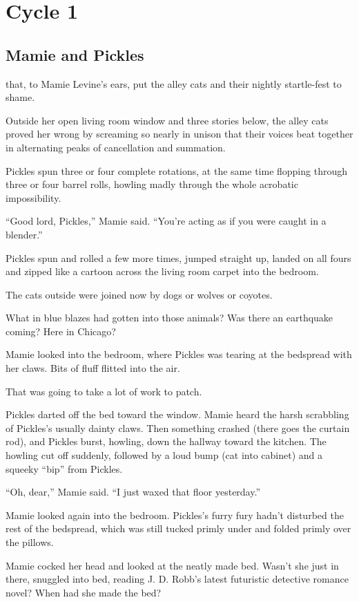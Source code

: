 \chapter{Cycle 1}

\section{Mamie and Pickles}

 that, to Mamie Levine’s ears, put the alley cats and their nightly startle-fest to shame.

Outside her open living room window and three stories below, the alley cats proved her wrong by screaming so nearly in unison that their voices beat together in alternating peaks of cancellation and summation.

Pickles spun three or four complete rotations, at the same time flopping through three or four barrel rolls, howling madly through the whole acrobatic impossibility.

“Good lord, Pickles,” Mamie said. “You’re acting as if you were caught in a blender.”

Pickles spun and rolled a few more times, jumped straight up, landed on all fours and zipped like a cartoon across the living room carpet into the bedroom.

The cats outside were joined now by dogs or wolves or coyotes.

What in blue blazes had gotten into those animals? Was there an earthquake coming? Here in Chicago?

Mamie looked into the bedroom, where Pickles was tearing at the bedspread with her claws. Bits of fluff flitted into the air.

That was going to take a lot of work to patch.

Pickles darted off the bed toward the window. Mamie heard the harsh scrabbling of Pickles’s usually dainty claws. Then something crashed (there goes the curtain rod), and Pickles burst, howling, down the hallway toward the kitchen. The howling cut off suddenly, followed by a loud bump (cat into cabinet) and a squeeky “bip” from Pickles.

“Oh, dear,” Mamie said. “I just waxed that floor yesterday.”

Mamie looked again into the bedroom. Pickles’s furry fury hadn’t disturbed the rest of the bedspread, which was still tucked primly under and folded primly over the pillows.

Mamie cocked her head and looked at the neatly made bed. Wasn’t she just in there, snuggled into bed, reading J. D. Robb’s latest futuristic detective romance novel? When had she made the bed?

